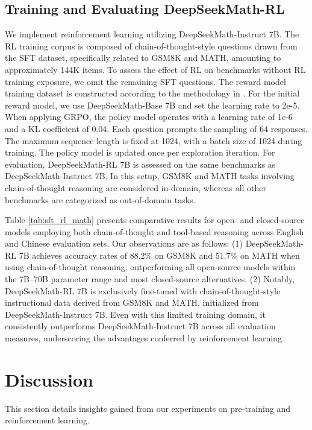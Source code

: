 \begin{itemize}[topsep=0pt]
\subsection{Training and Evaluating DeepSeekMath-RL}

We implement reinforcement learning utilizing DeepSeekMath-Instruct 7B. The RL training corpus is composed of chain-of-thought-style questions drawn from the SFT dataset, specifically related to GSM8K and MATH, amounting to approximately 144K items. To assess the effect of RL on benchmarks without RL training exposure, we omit the remaining SFT questions. The reward model training dataset is constructed according to the methodology in \citep{wang2023math}. For the initial reward model, we use DeepSeekMath-Base 7B and set the learning rate to 2e-5. When applying GRPO, the policy model operates with a learning rate of 1e-6 and a KL coefficient of 0.04. Each question prompts the sampling of $64$ responses. The maximum sequence length is fixed at 1024, with a batch size of 1024 during training. The policy model is updated once per exploration iteration. For evaluation, DeepSeekMath-RL 7B is assessed on the same benchmarks as DeepSeekMath-Instruct 7B. In this setup, GSM8K and MATH tasks involving chain-of-thought reasoning are considered in-domain, whereas all other benchmarks are categorized as out-of-domain tasks.

Table \ref{tab:sft_rl_math} presents comparative results for open- and closed-source models employing both chain-of-thought and tool-based reasoning across English and Chinese evaluation sets. Our observations are as follows: (1) DeepSeekMath-RL 7B achieves accuracy rates of 88.2\% on GSM8K and 51.7\% on MATH when using chain-of-thought reasoning, outperforming all open-source models within the 7B–70B parameter range and most closed-source alternatives. (2) Notably, DeepSeekMath-RL 7B is exclusively fine-tuned with chain-of-thought-style instructional data derived from GSM8K and MATH, initialized from DeepSeekMath-Instruct 7B. Even with this limited training domain, it consistently outperforms DeepSeekMath-Instruct 7B across all evaluation measures, underscoring the advantages conferred by reinforcement learning.

\section{Discussion}
This section details insights gained from our experiments on pre-training and reinforcement learning.


\end{itemize}
